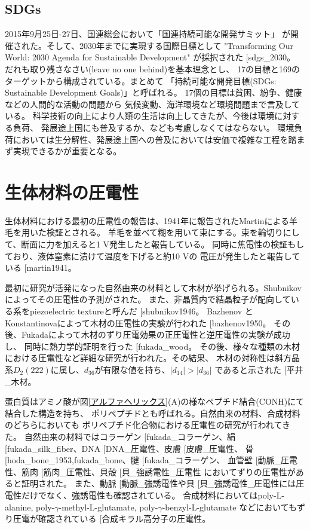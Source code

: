 \documentclass[dvipdfmx,12pt,a4paper]{jreport}
\makeatletter
\DeclareRobustCommand\cite{\unskip
    	\@ifnextchar[{\@tempswatrue\@citex}{\@tempswafalse\@citex[]}}
\makeatother
\begin{document}
		\subsection{SDGs}
		2015年9月25日-27日、国連総会において「国連持続可能な開発サミット」
		が開催された。そして、2030年までに実現する国際目標として
		 "Transforming Our World: 2030 Agenda for Sustainable Development" が採択された\cite{sdgs_2030}。
		だれも取り残さなさい(leave no one behind)を基本理念とし、
		17の目標と169のターゲットから構成されている。まとめて
		「持続可能な開発目標(SDGs: Sustainable Development Goals)」と呼ばれる。
		17個の目標は貧困、紛争、健康などの人間的な活動の問題から
		気候変動、海洋環境など環境問題まで言及している。
		科学技術の向上により人類の生活は向上してきたが、今後は環境に対する負荷、
		発展途上国にも普及するか、なども考慮しなくてはならない。
		環境負荷においては生分解性、発展途上国への普及においては安価で複雑な工程を踏まず実現できるかが重要となる。

		\newpage
		\section{生体材料の圧電性}
			生体材料における最初の圧電性の報告は、1941年に報告されたMartinによる羊毛を用いた検証とされる。
			羊毛を並べて糊を用いて束にする。束を輪切りにして、断面に力を加えると1 V発生したと報告している。
			同時に焦電性の検証もしており、液体窒素に漬けて温度を下げると約10 Vの
			電圧が発生したと報告している\cite{martin1941}。

			最初に研究が活発になった自然由来の材料として木材が挙げられる。Shubnikovによってその圧電性の予測がされた。
			また、非晶質内で結晶粒子が配向している系をpiezoelectric textureと呼んだ\cite{shubnikov1946}。
			Bazhenov と Konstantinovaによって木材の圧電性の実験が行われた\cite{bazhenov1950}。
			その後、Fukadaによって木材のずり圧電効果の正圧電性と逆圧電性の実験が成功し、
			同時に熱力学的証明を行った\cite{fukada_wood}。
			その後、様々な種類の木材における圧電性など詳細な研究が行われた。その結果、
			木材の対称性は斜方晶系$D_2(222)$に属し、$d_{36}$が有限な値を持ち、$|d_{14}|>|d_{36}|$
			であると示された\cite{平井_木材}。

			蛋白質はアミノ酸が図\ref{アルファヘリックス}(A)の様なペプチド結合(CONH)にて結合した構造を持ち、
			ポリペプチドとも呼ばれる。自然由来の材料、合成材料のどちらにおいても
			ポリペプチド化合物における圧電性の研究が行われてきた。
			自然由来の材料ではコラーゲン\cite{fukada_コラーゲン}、絹\cite{fukada_silk_fiber}、DNA\cite{DNA_圧電性}、皮膚\cite{皮膚_圧電性}、
			骨\cite{hoda_bone_1953,fukada_bone}、腱\cite{fukada_コラーゲン}、
			血管壁\cite{動脈_圧電性}、筋肉\cite{筋肉_圧電性}、貝殻\cite{貝_強誘電性_圧電性}
			においてずりの圧電性があると証明された。
			また、動脈\cite{動脈_強誘電性}や貝\cite{貝_強誘電性_圧電性}には圧電性だけでなく、強誘電性も確認されている。
			合成材料においてはpoly-L-alanine, poly-$\gamma$-methyl-L-glutamate, poly-$\gamma$-benzyl-L-glutamate
			などにおいてもずり圧電が確認されている\cite{合成キラル高分子の圧電性}。
\end{document}
